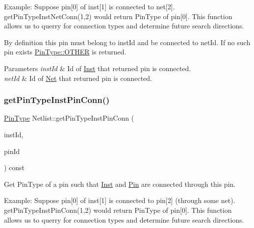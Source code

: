 Example\+: Suppose pin\mbox{[}0\mbox{]} of inst\mbox{[}1\mbox{]} is connected to net\mbox{[}2\mbox{]}. get\+Pin\+Type\+Inst\+Net\+Conn(1,2) would return Pin\+Type of pin\mbox{[}0\mbox{]}. This function allows us to querry for connection types and determine future search directions.

By definition this pin must belong to inst\+Id and be connected to net\+Id. If no such pin exists \hyperlink{type_8h_afaab50027002ecbb6c8ac27e727d1bb4a03570470bad94692ce93e32700d2e1cb}{Pin\+Type\+::\+O\+T\+H\+ER} is returned.


\begin{DoxyParams}{Parameters}
{\em inst\+Id} & Id of \hyperlink{classInst}{Inst} that returned pin is connected. \\
\hline
{\em net\+Id} & Id of \hyperlink{classNet}{Net} that returned pin is connected. \\
\hline
\end{DoxyParams}
\mbox{\label{classNetlist_a27d477f7bd6fffd915015dbd3b3a0649}} 
\subsubsection{\texorpdfstring{get\+Pin\+Type\+Inst\+Pin\+Conn()}{getPinTypeInstPinConn()}}
{\footnotesize\ttfamily \hyperlink{type_8h_afaab50027002ecbb6c8ac27e727d1bb4}{Pin\+Type} Netlist\+::get\+Pin\+Type\+Inst\+Pin\+Conn (\begin{DoxyParamCaption}\item[{\hyperlink{type_8h_a581e8093e28e7362f2b6937296190676}{Index\+Type}}]{inst\+Id,  }\item[{\hyperlink{type_8h_a581e8093e28e7362f2b6937296190676}{Index\+Type}}]{pin\+Id }\end{DoxyParamCaption}) const}



Get Pin\+Type of a pin such that \hyperlink{classInst}{Inst} and \hyperlink{classPin}{Pin} are connected through this pin. 

Example\+: Suppose pin\mbox{[}0\mbox{]} of inst\mbox{[}1\mbox{]} is connected to pin\mbox{[}2\mbox{]} (through some net). get\+Pin\+Type\+Inst\+Pin\+Conn(1,2) would return Pin\+Type of pin\mbox{[}0\mbox{]}. This function allows us to querry for connection types and determine future search directions.

